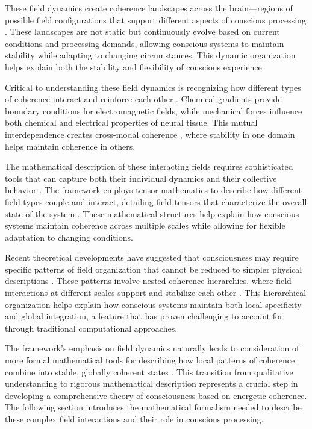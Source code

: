 \begin{refsection}
These field dynamics create coherence landscapes across the brain—regions of possible field configurations that support different aspects of conscious processing \cite{Atasoy2019}. These landscapes are not static but continuously evolve based on current conditions and processing demands, allowing conscious systems to maintain stability while adapting to changing circumstances. This dynamic organization helps explain both the stability and flexibility of conscious experience.

Critical to understanding these field dynamics is recognizing how different types of coherence interact and reinforce each other \cite{Freeman2006}. Chemical gradients provide boundary conditions for electromagnetic fields, while mechanical forces influence both chemical and electrical properties of neural tissue. This mutual interdependence creates cross-modal coherence \cite{DelGiudice1985}, where stability in one domain helps maintain coherence in others.

The mathematical description of these interacting fields requires sophisticated tools that can capture both their individual dynamics and their collective behavior \cite{Barrett2014}. The framework employs tensor mathematics to describe how different field types couple and interact, detailing field tensors that characterize the overall state of the system \cite{Aharonov1959}. These mathematical structures help explain how conscious systems maintain coherence across multiple scales while allowing for flexible adaptation to changing conditions.

Recent theoretical developments have suggested that consciousness may require specific patterns of field organization that cannot be reduced to simpler physical descriptions \cite{Nunez2010}. These patterns involve nested coherence hierarchies, where field interactions at different scales support and stabilize each other \cite{Wennekers2009}. This hierarchical organization helps explain how conscious systems maintain both local specificity and global integration, a feature that has proven challenging to account for through traditional computational approaches.

The framework's emphasis on field dynamics naturally leads to consideration of more formal mathematical tools for describing how local patterns of coherence combine into stable, globally coherent states \cite{Haken2006}. This transition from qualitative understanding to rigorous mathematical description represents a crucial step in developing a comprehensive theory of consciousness based on energetic coherence. The following section introduces the mathematical formalism needed to describe these complex field interactions and their role in conscious processing.


\end{refsection}
